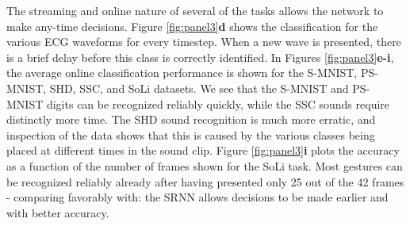 \documentclass[fleqn,10pt]{wlscirep}
\begin{document}
The streaming and online nature of several of the tasks allows the network to make any-time decisions. Figure \ref{fig:panel3}\textbf{d} shows the classification for the various ECG waveforms for every timestep. When a new wave is presented, there is a brief delay before this class is correctly identified. In Figures \ref{fig:panel3}\textbf{e-i}, the average online classification performance is shown for the  S-MNIST, PS-MNIST, SHD, SSC, and SoLi datasets. We see that the S-MNIST and PS-MNIST digits can be recognized reliably quickly, while the SSC sounds require distinctly more time. The SHD sound recognition is much more erratic, and inspection of the data shows that this is caused by the various classes being placed at different times in the sound clip. Figure \ref{fig:panel3}\textbf{i} plots the accuracy as a function of the number of frames shown for the SoLi task. Most gestures can be recognized reliably already after having presented only 25 out of the 42 frames - comparing favorably with\cite{wang2016interacting}: the SRNN allows decisions to be made earlier and with better accuracy. 
\end{document}
